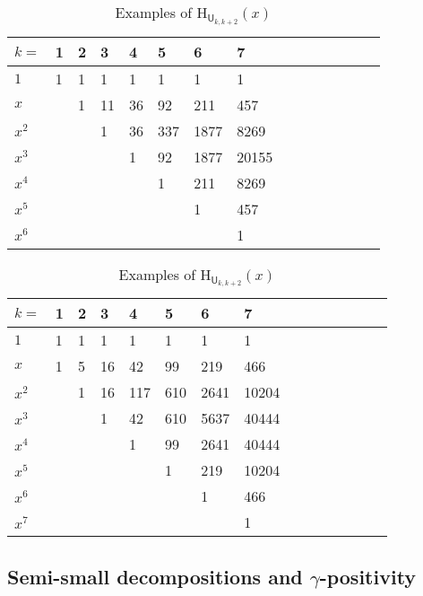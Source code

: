 \documentclass[11pt, a4paper, english]{amsart}
\theoremstyle{teoremas}
\theoremstyle{definition}
\newcommand{\U}{\mathsf{U}}
\renewcommand{\H}{\mathrm{H}}
\newcommand{\uH}{\underline{\mathrm{H}}}
\begin{document}
\begin{table}[htb]
       \begin{subtable}[t]{.5\textwidth}
        \caption{Examples of $\uH_{\U_{k,k+2}}(x)$}
        \raggedright
\begin{tabular}{l l l l l l l l l l l l l l l}\hline
$k=$      & 1   & 2 & 3 & 4 & 5 & 6 & 7\\ \hline
$1$  & 1 & 1 & 1 & 1 & 1 & 1 & 1 \\
$x$  &  & 1 & 11 & 36 & 92 & 211 & 457 \\
$x^2$  &  &  & 1 & 36 & 337 & 1877 & 8269 \\
$x^3$  &  &  &  & 1 & 92 & 1877 & 20155 \\
$x^4$  &  &  &  &  & 1 & 211 & 8269 \\
$x^5$  &  &  &  &  &  & 1 & 457 \\
$x^6$  &  &  &  &  &  &  & 1 \\
\end{tabular}
    \end{subtable}%
   \begin{subtable}[t]{.5\textwidth}
        \raggedleft
        \caption{Examples of $\H_{\U_{k,k+2}}(x)$}
\begin{tabular}{l l l l l l l l l l l l l l l}\hline
$k=$      & 1   & 2 & 3 & 4 & 5 & 6 & 7   \\ \hline
$1$  & 1 & 1 & 1 & 1 & 1 & 1 & 1 \\
$x$  & 1 & 5 & 16 & 42 & 99 & 219 & 466 \\
$x^2$  &  & 1 & 16 & 117 & 610 & 2641 & 10204 \\
$x^3$  &  &  & 1 & 42 & 610 & 5637 & 40444 \\
$x^4$  &  &  &  & 1 & 99 & 2641 & 40444 \\
$x^5$  &  &  &  &  & 1 & 219 & 10204 \\
$x^6$  &  &  &  &  &  & 1 & 466 \\
$x^7$  &  &  &  &  &  &  & 1 \\
\end{tabular}
    \end{subtable}
\end{table}



\subsection{Semi-small decompositions and \texorpdfstring{$\gamma$}{gamma}-positivity}\label{subsec:gamma-positivity}
\end{document}
